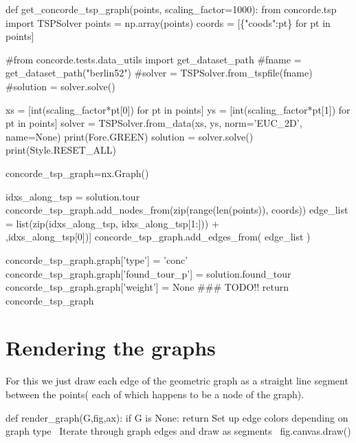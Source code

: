 \nwenddocs{}\plusendmoddef\nwstartdeflinemarkup{}\nwenddeflinemarkup
def get_concorde_tsp_graph(points, scaling_factor=1000):
     from concorde.tsp import TSPSolver
     points = np.array(points)
     coords = [\{"coods":pt\} for pt in points]

     #from concorde.tests.data_utils import get_dataset_path          
     #fname = get_dataset_path("berlin52")     
     #solver = TSPSolver.from_tspfile(fname)
     #solution = solver.solve()

     xs = [int(scaling_factor*pt[0]) for pt in points]
     ys = [int(scaling_factor*pt[1]) for pt in points]
     solver = TSPSolver.from_data(xs, ys, norm='EUC_2D', name=None)
     print(Fore.GREEN)
     solution = solver.solve()
     print(Style.RESET_ALL)

     concorde_tsp_graph=nx.Graph()
          
     idxs_along_tsp = solution.tour
     concorde_tsp_graph.add_nodes_from(zip(range(len(points)), coords))
     edge_list = list(zip(idxs_along_tsp, idxs_along_tsp[1:])) + \\
                    [(idxs_along_tsp[-1],idxs_along_tsp[0])]
     concorde_tsp_graph.add_edges_from(  edge_list  )

     concorde_tsp_graph.graph['type']   = 'conc'
     concorde_tsp_graph.graph['found_tour_p'] = solution.found_tour
     concorde_tsp_graph.graph['weight'] = None ### TODO!! 
     return concorde_tsp_graph
\nwendcode{}\nwdocspar





\section{Rendering the graphs}

For this we just draw each edge of the geometric graph as a straight line segment 
between the points( each of which happens to be a node of the graph). 

\nwenddocs{}\plusendmoddef\nwstartdeflinemarkup{}\nwenddeflinemarkup
def render_graph(G,fig,ax):
     if G is None:
            return
     \LA{}Set up edge colors depending on graph type~{\nwtagstyle{}}\RA{}
     \LA{}Iterate through graph edges and draw as segments~{\nwtagstyle{}}\RA{}
     fig.canvas.draw()
\nwendcode{}\nwdocspar


